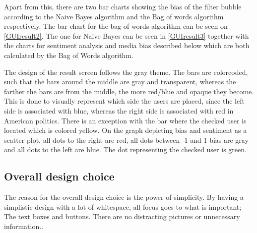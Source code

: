 
Apart from this, there are two bar charts showing the bias of the
filter bubble according to the Naive Bayes algorithm and the Bag of words
algorithm respectively. The bar chart for the bag of words algorithm can be seen
on \autoref{GUIresult2}. The one for Naive Bayes can be seen in
\autoref{GUIresult3} together with the charts for
sentiment analysis and media bias described below which are both calculated by the Bag of Words algorithm.


The design of the result screen follows the gray theme. The bars are colorcoded,
such that the bars around the middle are gray and transparent, whereas the
farther the bars are from the middle, the more red/blue and opaque they become.
This is done to visually represent which side the users are placed, since the
left side is associated with blue, whereas the right side is associated with red
in American politics. There is an exception with the bar where the checked user
is located which is colored yellow. On the graph depicting bias and sentiment as
a scatter plot, all dots to the right are red, all dots between -1 and 1 bias are
gray and all dots to the left are blue. The dot representing the checked user
is green.

\subsection{Overall design choice}
The reason for the overall design choice is the power of simplicity. By having a
simplistic design with a lot of whitespace, all focus goes to what is
important; The text boxes and buttons. There are no distracting
pictures or unnecessary information.\citep[p. 26 \& 32]{WebUI}.\\